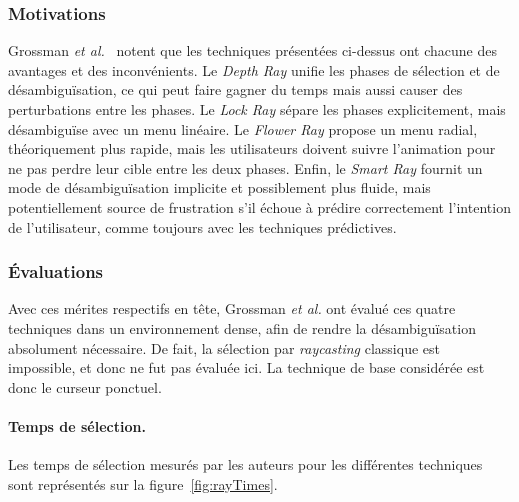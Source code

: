 	\subsubsection{Motivations}
	Grossman \emph{et al.}~\cite{grossman2006design} notent que les techniques présentées ci-dessus ont chacune des avantages et des inconvénients. Le \emph{Depth Ray} unifie les phases de sélection et de désambiguïsation, ce qui peut faire gagner du temps mais aussi causer des perturbations entre les phases. Le \emph{Lock Ray} sépare les phases explicitement, mais désambiguïse avec un menu linéaire. Le \emph{Flower Ray} propose un menu radial, théoriquement plus rapide, mais les utilisateurs doivent suivre l'animation pour ne pas perdre leur cible entre les deux phases. Enfin, le \emph{Smart Ray} fournit un mode de désambiguïsation implicite et possiblement plus fluide, mais potentiellement source de frustration s'il échoue à prédire correctement l'intention de l'utilisateur, comme toujours avec les techniques prédictives.
	
	\subsubsection{Évaluations}
	Avec ces mérites respectifs en tête, Grossman \emph{et al.} ont évalué ces quatre techniques dans un environnement dense, afin de rendre la désambiguïsation absolument nécessaire. De fait, la sélection par \emph{raycasting} classique est impossible, et donc ne fut pas évaluée ici. La technique de base considérée est donc le curseur ponctuel.

	\paragraph{Temps de sélection.}
	
	Les temps de sélection mesurés par les auteurs pour les différentes techniques sont représentés sur la figure~\ref{fig:rayTimes}.
	
